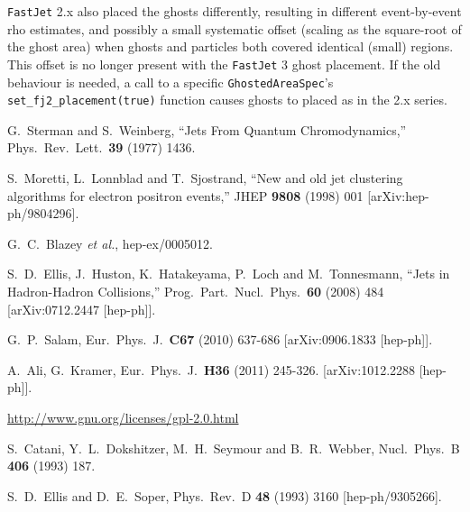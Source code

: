 \documentclass[12pt,a4]{article}
\newcommand{\fastjet}{\texttt{FastJet}\xspace}
\newcommand{\ttt}[1]{{\small\texttt{#1}}}
\begin{document}
\fastjet 2.x also placed the ghosts differently, resulting in different
event-by-event rho estimates, and possibly a small systematic offset
(scaling as the square-root of the ghost area) when ghosts and
particles both covered identical (small) regions.
%
This offset is no longer present with the \fastjet 3 ghost placement.
%
If the old behaviour is needed, a call to a specific
\ttt{GhostedAreaSpec}'s \ttt{set\_fj2\_placement(true)} function
causes ghosts to placed as in the 2.x series.



\newpage

\begin{thebibliography}{99}

  G.~Sterman and S.~Weinberg,
  ``Jets From Quantum Chromodynamics,''
  Phys.\ Rev.\ Lett.\  {\bf 39} (1977) 1436.

  S.~Moretti, L.~Lonnblad and T.~Sjostrand,
   ``New and old jet clustering algorithms for electron positron events,''
  JHEP {\bf 9808} (1998) 001
  [arXiv:hep-ph/9804296].

  G.~C.~Blazey {\it et al.},
  hep-ex/0005012.

  S.~D.~Ellis, J.~Huston, K.~Hatakeyama, P.~Loch and M.~Tonnesmann,
  ``Jets in Hadron-Hadron Collisions,''
  Prog.\ Part.\ Nucl.\ Phys.\  {\bf 60} (2008) 484
  [arXiv:0712.2447 [hep-ph]].

  G.~P.~Salam,
  Eur.\ Phys.\ J.\  {\bf C67 } (2010)  637-686
  [arXiv:0906.1833 [hep-ph]].


  A.~Ali, G.~Kramer,
  Eur.\ Phys.\ J.\  {\bf H36 } (2011)  245-326.
  [arXiv:1012.2288 [hep-ph]].

  \url{http://www.gnu.org/licenses/gpl-2.0.html}

  S.~Catani, Y.~L.~Dokshitzer, M.~H.~Seymour and B.~R.~Webber,
  Nucl.\ Phys.\ B {\bf 406}  (1993)  187.

  S.~D.~Ellis and D.~E.~Soper,
  Phys.\ Rev.\ D {\bf 48} (1993) 3160 
  [hep-ph/9305266]. 


\end{thebibliography}
\end{document}
